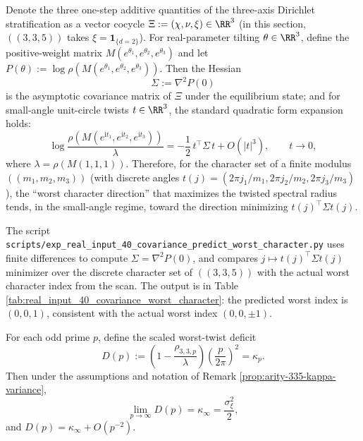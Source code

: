 \begin{remark}\label{prop:arity-335-worst-direction-cov}
Denote the three one-step additive quantities of the three-axis Dirichlet stratification as a vector cocycle
\(
\Xi:=(\chi,\nu,\xi)\in\RR^3
\)
(in this section, \(((3,3,5))\) takes \(\xi=\mathbf{1}_{\{d=2\}}\)).
For real-parameter tilting \(\theta\in\RR^3\), define the positive-weight matrix \(M(e^{\theta_1},e^{\theta_2},e^{\theta_3})\) and let
\(
P(\theta):=\log\rho(M(e^{\theta_1},e^{\theta_2},e^{\theta_3}))
\).
Then the Hessian
\[
\Sigma:=\nabla^2 P(0)
\]
is the asymptotic covariance matrix of \(\Xi\) under the equilibrium state; and for small-angle unit-circle twists \(t\in\RR^3\), the standard quadratic form expansion holds:
\[
\log\frac{\rho(M(e^{\mathrm{i}t_1},e^{\mathrm{i}t_2},e^{\mathrm{i}t_3}))}{\lambda}
=
-\frac12\,t^\top\Sigma\,t
+O(|t|^3),
\qquad t\to 0,
\]
where \(\lambda=\rho(M(1,1,1))\).
Therefore, for the character set of a finite modulus \(((m_1,m_2,m_3))\) (with discrete angles \(t(j)=(2\pi j_1/m_1,2\pi j_2/m_2,2\pi j_3/m_3)\)), the ``worst character direction'' that maximizes the twisted spectral radius tends, in the small-angle regime, toward the direction minimizing \(t(j)^\top\Sigma t(j)\).
\end{remark}

\begin{remark}\label{rem:arity-335-worst-direction-cov-check}
The script \texttt{scripts/exp\_real\_input\_40\_covariance\_predict\_worst\_character.py} uses finite differences to compute \(\Sigma=\nabla^2P(0)\), and compares
\(
j\mapsto t(j)^\top\Sigma t(j)
\)
minimizer over the discrete character set of \(((3,3,5))\) with the actual worst character index from the scan. The output is in Table \ref{tab:real_input_40_covariance_worst_character}: the predicted worst index is \((0,0,1)\), consistent with the actual worst index \((0,0,\pm1)\).
\end{remark}





\begin{remark}\label{thm:arity-335-limit-law}
For each odd prime \(p\), define the scaled worst-twist deficit
$$
D(p)
:=
\left(1-\frac{\rho_{3,3,p}}{\lambda}\right)\left(\frac{p}{2\pi}\right)^2
=\kappa_p.
$$
Then under the assumptions and notation of Remark \ref{prop:arity-335-kappa-variance},
$$
\lim_{p\to\infty}D(p)=\kappa_\infty=\frac{\sigma_\xi^2}{2},
$$
and \(D(p)=\kappa_\infty+O(p^{-2})\).
\end{remark}

